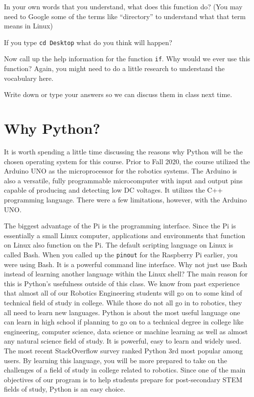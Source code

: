\documentclass[
]{book}
\begin{document}
In your own words that you understand, what does this function do? (You may need to Google some of the terms like ``directory'' to understand what that term means in Linux)

If you type \texttt{cd\ Desktop} what do you think will happen?

Now call up the help information for the function \texttt{if}.
Why would we ever use this function? Again, you might need to do a little research to understand the vocabulary here.

Write down or type your answers so we can discuss them in class next time.

\hypertarget{why-python}{%
\section{Why Python?}\label{why-python}}

It is worth spending a little time discussing the reasons why Python will be the chosen operating system for this course. Prior to Fall 2020, the course utilized the Arduino UNO as the microprocessor for the robotics systems. The Arduino is also a versatile, fully programmable microcomputer with input and output pins capable of producing and detecting low DC voltages. It utilizes the C++ programming language. There were a few limitations, however, with the Arduino UNO.

The biggest advantage of the Pi is the programming interface. Since the Pi is essentially a small Linux computer, applications and environments that function on Linux also function on the Pi. The default scripting language on Linux is called Bash. When you called up the \texttt{pinout} for the Raspberry Pi earlier, you were using Bash. It is a powerful command line interface. Why not just use Bash instead of learning another language within the Linux shell? The main reason for this is Python's usefulness outside of this class. We know from past experience that almost all of our Robotics Engineering students will go on to some kind of technical field of study in college. While those do not all go in to robotics, they all need to learn new languages. Python is about the most useful language one can learn in high school if planning to go on to a technical degree in college like engineering, computer science, data science or machine learning as well as almost any natural science field of study. It is powerful, easy to learn and widely used. The most recent StackOverflow survey ranked Python 3rd most popular among users. By learning this language, you will be more prepared to take on the challenges of a field of study in college related to robotics. Since one of the main objectives of our program is to help students prepare for post-secondary STEM fields of study, Python is an easy choice.
\end{document}
